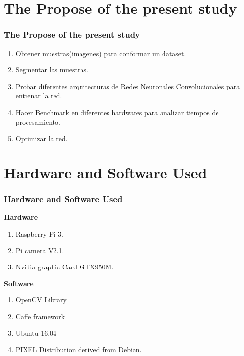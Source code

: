 \documentclass[10pt,a4paper]{beamer}
\begin{document}
\section{The Propose of the present study}
\begin{frame}
\frametitle{The Propose of the present study}
\begin{enumerate}
\item Obtener muestras(imagenes) para conformar un dataset.
\item Segmentar las muestras.
\item Probar diferentes arquitecturas de Redes Neuronales Convolucionales para entrenar la red.
\item Hacer Benchmark en diferentes hardwares para analizar tiempos de procesamiento.
\item Optimizar la red.
\end{enumerate}
\end{frame}
\section{Hardware and Software Used}
\begin{frame}
\frametitle{Hardware and Software Used}
\textbf{Hardware}
\begin{enumerate}
\item Raspberry Pi 3.
\item Pi camera V2.1.
\item Nvidia graphic Card GTX950M.
\end{enumerate}
\textbf{Software}
\begin{enumerate}
\item OpenCV Library
\item Caffe framework
\item Ubuntu 16.04
\item PIXEL Distribution derived from Debian.
\end{enumerate}
\end{frame}
\end{document}
